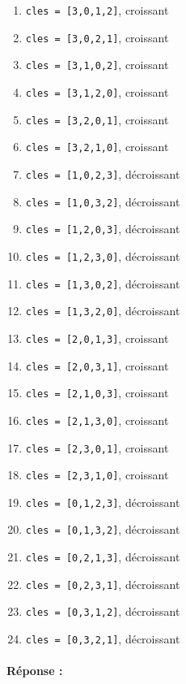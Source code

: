 \documentclass[11pt,a4paper]{article}
\begin{document}
\noindent
\begin{minipage}[t]{7cm}
\begin{enumerate}
\item \texttt{cles = [3,0,1,2]}, croissant
\item \texttt{cles = [3,0,2,1]}, croissant
\item \texttt{cles = [3,1,0,2]}, croissant
\item \texttt{cles = [3,1,2,0]}, croissant
\item \texttt{cles = [3,2,0,1]}, croissant
\item \texttt{cles = [3,2,1,0]}, croissant
\item \texttt{cles = [1,0,2,3]}, décroissant
\item \texttt{cles = [1,0,3,2]}, décroissant
\item \texttt{cles = [1,2,0,3]}, décroissant
\item \texttt{cles = [1,2,3,0]}, décroissant
\item \texttt{cles = [1,3,0,2]}, décroissant
\item \texttt{cles = [1,3,2,0]}, décroissant
\end{enumerate}
\end{minipage}
\hfill
\begin{minipage}[t]{7cm}
\begin{enumerate}\setcounter{enumi}{12}
\item \texttt{cles = [2,0,1,3]}, croissant
\item \texttt{cles = [2,0,3,1]}, croissant
\item \texttt{cles = [2,1,0,3]}, croissant
\item \texttt{cles = [2,1,3,0]}, croissant
\item \texttt{cles = [2,3,0,1]}, croissant
\item \texttt{cles = [2,3,1,0]}, croissant
\item \texttt{cles = [0,1,2,3]}, décroissant
\item \texttt{cles = [0,1,3,2]}, décroissant
\item \texttt{cles = [0,2,1,3]}, décroissant
\item \texttt{cles = [0,2,3,1]}, décroissant
\item \texttt{cles = [0,3,1,2]}, décroissant
\item \texttt{cles = [0,3,2,1]}, décroissant
\end{enumerate}
\end{minipage}
\paragraph{Réponse :}\mbox{}\\
\framebox[\textwidth]{$\rule{0cm}{22cm}$}

\end{document}
